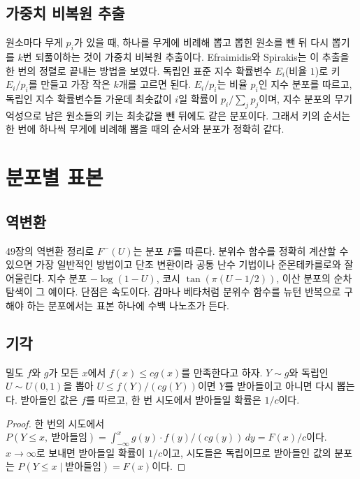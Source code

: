 \subsection{가중치 비복원 추출}

원소마다 무게 $p_i$가 있을 때, 하나를 무게에 비례해 뽑고 뽑힌 원소를 뺀 뒤 다시 뽑기를 $k$번 되풀이하는 것이 가중치 비복원 추출이다. Efraimidis와 Spirakis는 이 추출을 한 번의 정렬로 끝내는 방법을 보였다\cite{efraimidis2006}. 독립인 표준 지수 확률변수 $E_i$(비율 $1$)로 키 $E_i/p_i$를 만들고 가장 작은 $k$개를 고르면 된다. $E_i/p_i$는 비율 $p_i$인 지수 분포를 따르고, 독립인 지수 확률변수들 가운데 최솟값이 $i$일 확률이 $p_i/\sum_jp_j$이며, 지수 분포의 무기억성으로 남은 원소들의 키는 최솟값을 뺀 뒤에도 같은 분포이다. 그래서 키의 순서는 한 번에 하나씩 무게에 비례해 뽑을 때의 순서와 분포가 정확히 같다.

\section{분포별 표본}
\label{sec:variate-generation}

\subsection{역변환}

49장의 역변환 정리로 $F^{-}(U)$는 분포 $F$를 따른다. 분위수 함수를 정확히 계산할 수 있으면 가장 일반적인 방법이고 단조 변환이라 공통 난수 기법이나 준몬테카를로와 잘 어울린다. 지수 분포 $-\log(1-U)$, 코시 $\tan(\pi(U-1/2))$, 이산 분포의 순차 탐색이 그 예이다. 단점은 속도이다. 감마나 베타처럼 분위수 함수를 뉴턴 반복으로 구해야 하는 분포에서는 표본 하나에 수백 나노초가 든다.

\subsection{기각}

\begin{proposition}
\label{prop:rejection}
밀도 $f$와 $g$가 모든 $x$에서 $f(x)\le cg(x)$를 만족한다고 하자. $Y\sim g$와 독립인 $U\sim U(0,1)$을 뽑아 $U\le f(Y)/(cg(Y))$이면 $Y$를 받아들이고 아니면 다시 뽑는다. 받아들인 값은 $f$를 따르고, 한 번 시도에서 받아들일 확률은 $1/c$이다.
\end{proposition}

\begin{proof}
한 번의 시도에서 $P(Y\le x,\ \text{받아들임})=\int_{-\infty}^xg(y)\cdot f(y)/(cg(y))\,dy=F(x)/c$이다. $x\to\infty$로 보내면 받아들일 확률이 $1/c$이고, 시도들은 독립이므로 받아들인 값의 분포는 $P(Y\le x\mid\text{받아들임})=F(x)$이다.
\end{proof}

